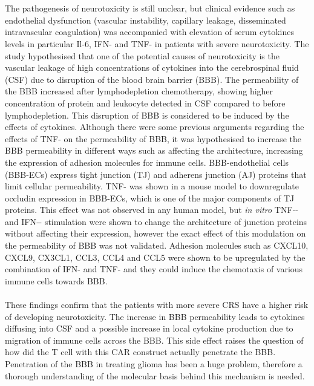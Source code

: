 \documentclass[12pt,oneside]{report}
\begin{document}
\\\\The pathogenesis of neurotoxicity is still unclear, but clinical evidence such as endothelial dysfunction (vascular instability, capillary leakage, disseminated intravascular coagulation) was accompanied with elevation of serum cytokines levels in particular Il-6, IFN-\textgamma{} and TNF-\textalpha{} in patients with severe neurotoxicity\citep{cyto-11}. The study hypothesised that one of the potential causes of neurotoxicity is the vascular leakage of high concentrations of cytokines into the cerebrospinal fluid (CSF) due to disruption of the blood brain barrier (BBB). The permeability of the BBB increased after lymphodepletion chemotherapy, showing higher concentration of protein and leukocyte detected in CSF compared to before lymphodepletion\citep{cyto-11}. This disruption of BBB is considered to be induced by the effects of cytokines\citep{BBB-1}. Although there were some previous arguments regarding the effects of TNF-\textalpha{} on the permeability of BBB\citep{BBB-4}, it was hypothesised to increase the BBB permeability in different ways such as affecting the architecture, increasing the expression of adhesion molecules for immune cells\citep{BBB-5}. BBB-endothelial cells (BBB-ECs) express tight junction (TJ) and adherens junction (AJ) proteins that limit cellular permeability\citep{BBB-1}. TNF-\textalpha{} was shown in a mouse model to downregulate occludin expression in BBB-ECs, which is one of the major components of TJ proteins\citep{BBB-2}. This effect was not observed in any human model, but \textit{in vitro} TNF‐-\textalpha{} and IFN‐-\textgamma{} stimulation were shown to change the architecture of junction proteins without affecting their expression\cite{BBB-2, BBB-3}, however the exact effect of this modulation on the permeability of BBB was not validated. Adhesion molecules such as CXCL10, CXCL9, CX3CL1, CCL3, CCL4 and CCL5 were shown to be upregulated by the combination of IFN-\textgamma{} and TNF-\textalpha{} \citep{BBB-1} and they could induce the chemotaxis of various immune cells towards BBB\citep{BBB-1}. 
\\\\These findings confirm that the patients with more severe CRS have a higher risk of developing neurotoxicity. The increase in BBB permeability leads to cytokines diffusing into CSF and a possible increase in local cytokine production due to migration of immune cells across the BBB. This side effect raises the question of how did the T cell with this CAR construct actually penetrate the BBB. Penetration of the BBB in treating glioma has been a huge problem, therefore a thorough understanding of the molecular basis behind this mechanism is needed.
\end{document}
